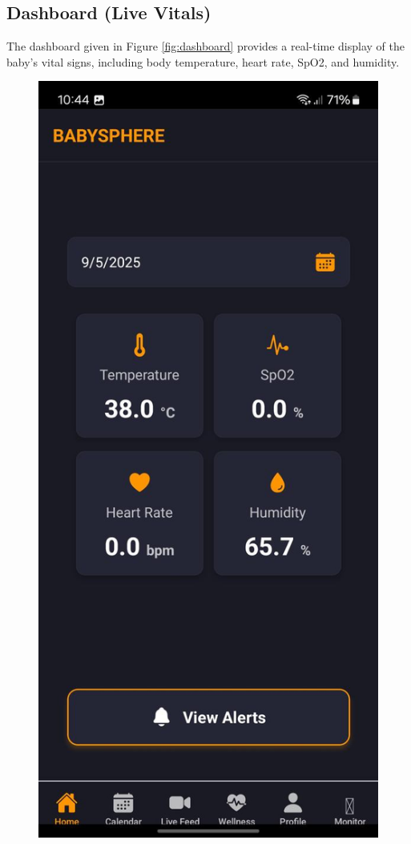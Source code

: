 \documentclass[12pt,a4paper]{report}
\begin{document}
\subsection{Dashboard (Live Vitals)}
The dashboard given in Figure \ref{fig:dashboard} provides a real-time display of the baby's vital signs, including body temperature, heart rate, SpO2, and humidity. 

  \begin{figure}[htbp]
    \centering
    \includegraphics[scale=0.2]{./pic/dashboard.jpeg}

\end{figure}
\end{document}
